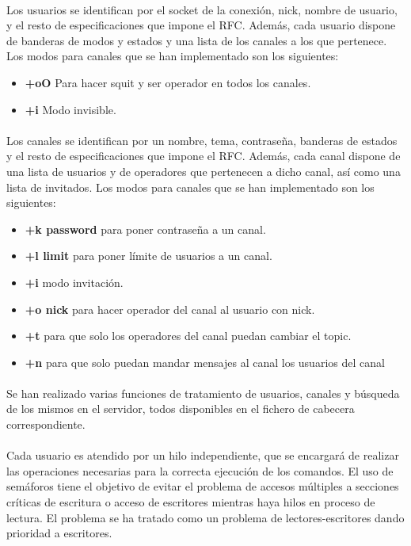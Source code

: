 \documentclass{mathnotes}
\begin{document}
\paragraph{}
Los usuarios se identifican por el socket de la conexión, nick, nombre de usuario, y el resto de especificaciones que impone el RFC. Además, cada usuario dispone de banderas de modos y estados y una lista de los canales a los que pertenece.
Los modos para canales que se han implementado son los siguientes:
\begin{itemize}
\item \textbf{+oO} Para hacer squit y ser operador en todos los canales.
\item \textbf{+i} Modo invisible.
\end{itemize}
\paragraph{}
Los canales se identifican por un nombre, tema, contraseña, banderas de estados y el resto de especificaciones que impone el RFC. Además, cada canal dispone de una lista de usuarios y de operadores que pertenecen a dicho canal, así como una lista de invitados.
Los modos para canales que se han implementado son los siguientes:
\begin{itemize}
\item \textbf{+k password} para poner contraseña a un canal.
\item \textbf{+l limit} para poner límite de usuarios a un canal.
\item \textbf{+i} modo invitación.
\item \textbf{+o nick} para hacer operador del canal al usuario con nick.
\item \textbf{+t} para que solo los operadores del canal puedan cambiar el topic.
\item \textbf{+n} para que solo puedan mandar mensajes al canal los usuarios del canal
\end{itemize}
\paragraph{}
Se han realizado varias funciones de tratamiento de usuarios, canales y búsqueda de los mismos en el servidor, todos disponibles en el fichero de cabecera correspondiente.
\paragraph{}
Cada usuario es atendido por un hilo independiente, que se encargará de realizar las operaciones necesarias para la correcta ejecución de los comandos.
El uso de semáforos tiene el objetivo de evitar el problema de accesos múltiples a secciones críticas de escritura o acceso de escritores mientras haya hilos en proceso de lectura.
El problema se ha tratado como un problema de lectores-escritores dando prioridad a escritores.
\end{document}
